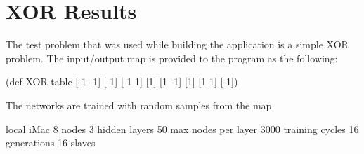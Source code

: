 \chapter[XOR Results]{XOR Results}
The test problem that was used while building the application is a simple XOR problem. The input/output map is provided to the program as the following: 

(def XOR-table {[-1 -1] [-1]
                [-1 1] [1]
                [1 -1] [1]
                [1 1] [-1]})

The networks are trained with random samples from the map.

local iMac
8 nodes
3 hidden layers
50 max nodes per layer
3000 training cycles
16 generations
16 slaves

